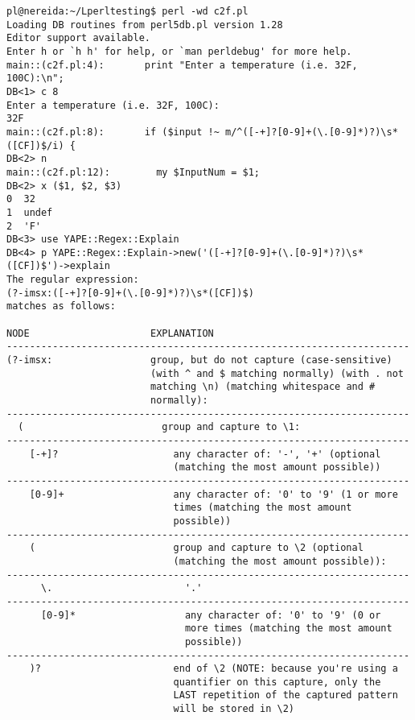 \begin{latexonly}
\begin{verbatim}
pl@nereida:~/Lperltesting$ perl -wd c2f.pl
Loading DB routines from perl5db.pl version 1.28
Editor support available.
Enter h or `h h' for help, or `man perldebug' for more help.
main::(c2f.pl:4):       print "Enter a temperature (i.e. 32F, 100C):\n";
DB<1> c 8
Enter a temperature (i.e. 32F, 100C):
32F
main::(c2f.pl:8):       if ($input !~ m/^([-+]?[0-9]+(\.[0-9]*)?)\s*([CF])$/i) {
DB<2> n
main::(c2f.pl:12):        my $InputNum = $1;
DB<2> x ($1, $2, $3)
0  32
1  undef
2  'F'
DB<3> use YAPE::Regex::Explain
DB<4> p YAPE::Regex::Explain->new('([-+]?[0-9]+(\.[0-9]*)?)\s*([CF])$')->explain
The regular expression:
(?-imsx:([-+]?[0-9]+(\.[0-9]*)?)\s*([CF])$)
matches as follows:

NODE                     EXPLANATION
----------------------------------------------------------------------
(?-imsx:                 group, but do not capture (case-sensitive)
                         (with ^ and $ matching normally) (with . not
                         matching \n) (matching whitespace and #
                         normally):
----------------------------------------------------------------------
  (                        group and capture to \1:
----------------------------------------------------------------------
    [-+]?                    any character of: '-', '+' (optional
                             (matching the most amount possible))
----------------------------------------------------------------------
    [0-9]+                   any character of: '0' to '9' (1 or more
                             times (matching the most amount
                             possible))
----------------------------------------------------------------------
    (                        group and capture to \2 (optional
                             (matching the most amount possible)):
----------------------------------------------------------------------
      \.                       '.'
----------------------------------------------------------------------
      [0-9]*                   any character of: '0' to '9' (0 or
                               more times (matching the most amount
                               possible))
----------------------------------------------------------------------
    )?                       end of \2 (NOTE: because you're using a
                             quantifier on this capture, only the
                             LAST repetition of the captured pattern
                             will be stored in \2)

\end{verbatim}
\end{latexonly}
